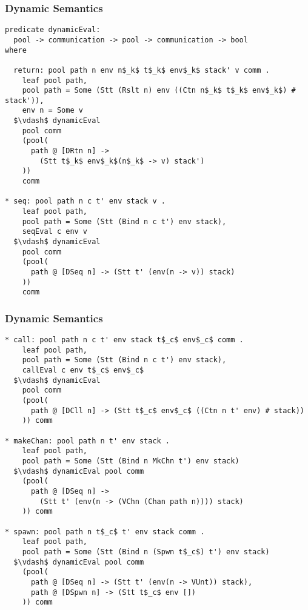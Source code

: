 \documentclass{beamer}
\begin{document}
\begin{frame}[fragile]
	\frametitle{Dynamic Semantics}
\begin{lstlisting}[language=logic, mathescape]
predicate dynamicEval:
  pool -> communication -> pool -> communication -> bool
where

  return: pool path n env n$_k$ t$_k$ env$_k$ stack' v comm .
    leaf pool path,
    pool path = Some (Stt (Rslt n) env ((Ctn n$_k$ t$_k$ env$_k$) # stack')),
    env n = Some v
  $\vdash$ dynamicEval
    pool comm
    (pool(
      path @ [DRtn n] ->
        (Stt t$_k$ env$_k$(n$_k$ -> v) stack')
    ))
    comm

* seq: pool path n c t' env stack v .
    leaf pool path,
    pool path = Some (Stt (Bind n c t') env stack),
    seqEval c env v
  $\vdash$ dynamicEval
    pool comm
    (pool(
      path @ [DSeq n] -> (Stt t' (env(n -> v)) stack)
    ))
    comm
\end{lstlisting}
\end{frame}

\begin{frame}[fragile]
	\frametitle{Dynamic Semantics}
\begin{lstlisting}[language=logic, mathescape]
* call: pool path n c t' env stack t$_c$ env$_c$ comm .
    leaf pool path,
    pool path = Some (Stt (Bind n c t') env stack),
    callEval c env t$_c$ env$_c$
  $\vdash$ dynamicEval
    pool comm
    (pool(
      path @ [DCll n] -> (Stt t$_c$ env$_c$ ((Ctn n t' env) # stack))
    )) comm

* makeChan: pool path n t' env stack .
    leaf pool path,
    pool path = Some (Stt (Bind n MkChn t') env stack)
  $\vdash$ dynamicEval pool comm 
    (pool(
      path @ [DSeq n] ->
        (Stt t' (env(n -> (VChn (Chan path n)))) stack)
    )) comm

* spawn: pool path n t$_c$ t' env stack comm .
    leaf pool path, 
    pool path = Some (Stt (Bind n (Spwn t$_c$) t') env stack)
  $\vdash$ dynamicEval pool comm 
    (pool(
      path @ [DSeq n] -> (Stt t' (env(n -> VUnt)) stack),
      path @ [DSpwn n] -> (Stt t$_c$ env [])
    )) comm
\end{lstlisting}
\end{frame}
\end{document}
